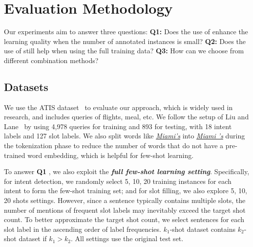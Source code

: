 \section{Evaluation Methodology}
Our experiments
aim to %
answer three questions: \textbf{Q1:} Does the use of \REs enhance the learning quality when the number of annotated
instances is small?  \textbf{Q2:}  Does the use of \REs still help when using the full training data?
 \textbf{Q3:}  How can we choose from different combination methods?

\subsection{Datasets}
\label{sec_datasest}

We use the ATIS dataset~\cite{hemphill1990atis} to evaluate our approach, which is widely used in \SLU research, and
includes queries of flights, meal, etc. We follow the setup of Liu and Lane~ by using 4,978 queries for training and 893 for
testing, with 18 intent labels and 127 slot labels.
We also split words like
\textsl{\underline{Miami's}} into \textsl{\underline{Miami 's}} during the tokenization phase to reduce the number of words that do not have a pre-trained word
embedding, which is helpful for few-shot learning.

To answer  \textbf{Q1} , we also exploit the \textbf{\emph{full few-shot learning setting}}. Specifically, for intent detection, we randomly
select 5, 10, 20 training instances for each intent to form the few-shot training set; and for slot filling, we also explore 5, 10, 20
shots settings. 
However, since a sentence typically contains multiple slots, the number of mentions of frequent slot labels may inevitably exceed
the target shot count.
To better approximate the target shot count, we select sentences for each slot label  in the
ascending order of label frequencies.
$k_1$-shot dataset contains $k_2$-shot dataset if $k_1>k_2$.
All settings use the original test set.

